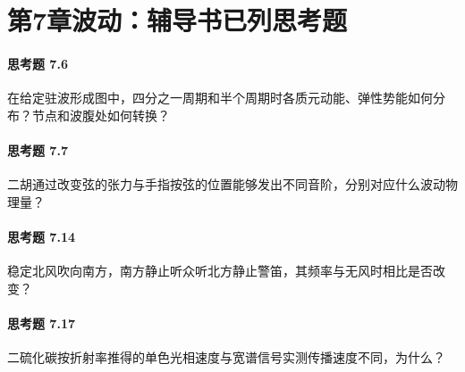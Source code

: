 \section*{第7章\quad 波动：辅导书已列思考题}
\paragraph{思考题 7.6}
在给定驻波形成图中，四分之一周期和半个周期时各质元动能、弹性势能如何分布？节点和波腹处如何转换？

\paragraph{思考题 7.7}
二胡通过改变弦的张力与手指按弦的位置能够发出不同音阶，分别对应什么波动物理量？

\paragraph{思考题 7.14}
稳定北风吹向南方，南方静止听众听北方静止警笛，其频率与无风时相比是否改变？

\paragraph{思考题 7.17}
二硫化碳按折射率推得的单色光相速度与宽谱信号实测传播速度不同，为什么？
